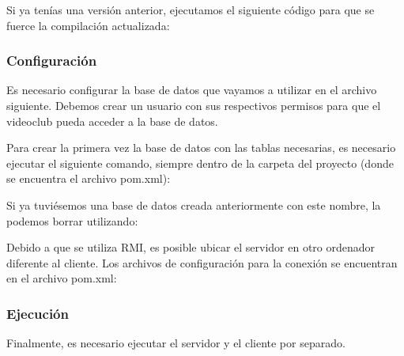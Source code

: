 Si ya tenías una versión anterior, ejecutamos el siguiente código para que se fuerce la compilación actualizada\+: 
\begin{DoxyCode}{0}
\end{DoxyCode}


\subsubsection*{Configuración}

Es necesario configurar la base de datos que vayamos a utilizar en el archivo siguiente. Debemos crear un usuario con sus respectivos permisos para que el videoclub pueda acceder a la base de datos.


\begin{DoxyCode}{0}
\end{DoxyCode}


Para crear la primera vez la base de datos con las tablas necesarias, es necesario ejecutar el siguiente comando, siempre dentro de la carpeta del proyecto (donde se encuentra el archivo pom.\+xml)\+:


\begin{DoxyCode}{0}
\end{DoxyCode}


Si ya tuviésemos una base de datos creada anteriormente con este nombre, la podemos borrar utilizando\+:


\begin{DoxyCode}{0}
\end{DoxyCode}


Debido a que se utiliza R\+MI, es posible ubicar el servidor en otro ordenador diferente al cliente. Los archivos de configuración para la conexión se encuentran en el archivo pom.\+xml\+:


\begin{DoxyCode}{0}
\end{DoxyCode}


\subsubsection*{Ejecución}

Finalmente, es necesario ejecutar el servidor y el cliente por separado.


